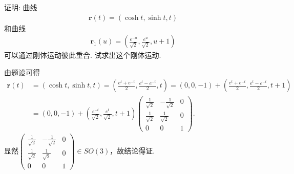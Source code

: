 \documentclass[../../main.tex]{subfiles}%
\begin{document}
\begin{example}
证明: 曲线
\begin{align*}
\bm{r}(t) = (\cosh t, \sinh t, t)
\end{align*}
和曲线
\begin{align*}
\bm{r}_1(u) = \left( \frac{e^{-u}}{\sqrt{2}}, \frac{e^{u}}{\sqrt{2}}, u + 1 \right)
\end{align*}
可以通过刚体运动彼此重合. 试求出这个刚体运动.
\end{example}
\begin{solution}
由题设可得
\begin{align*}
\bm{r}(t)&=(\cosh t,\sinh t,t)=\left(\frac{e^t+e^{-t}}{2},\frac{e^t-e^{-t}}{2},t\right)=(0,0,-1)+\left(\frac{e^t+e^{-t}}{2},\frac{e^t-e^{-t}}{2},t+1\right)\\
&=(0,0,-1)+\left(\frac{e^{-t}}{\sqrt{2}},\frac{e^t}{\sqrt{2}},t+1\right)\begin{pmatrix}
\frac{1}{\sqrt{2}}&-\frac{1}{\sqrt{2}}&0\\
\frac{1}{\sqrt{2}}&\frac{1}{\sqrt{2}}&0\\
0&0&1
\end{pmatrix}.
\end{align*}
显然$\begin{pmatrix}
\frac{1}{\sqrt{2}}&-\frac{1}{\sqrt{2}}&0\\
\frac{1}{\sqrt{2}}&\frac{1}{\sqrt{2}}&0\\
0&0&1
\end{pmatrix}\in SO(3)$，故结论得证.

\end{solution}
\end{document}
